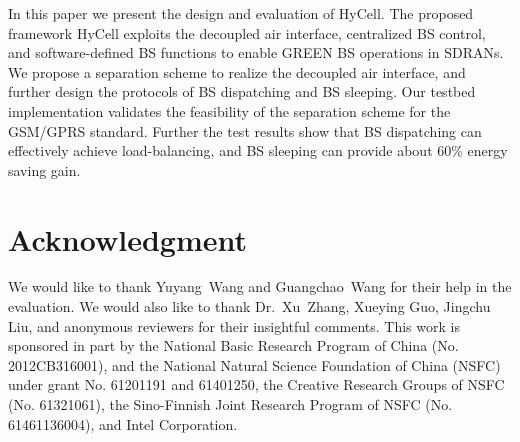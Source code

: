 \documentclass[conference]{IEEEtran}
\begin{document}
In this paper we present the design and evaluation of HyCell. The proposed
framework HyCell
exploits the decoupled air interface, centralized BS control, and software-defined BS
functions to enable GREEN BS operations in SDRANs. We propose
a separation scheme to realize the decoupled air interface, and
further design the protocols of BS dispatching and BS sleeping.
Our testbed implementation validates the feasibility of the separation scheme
for the GSM/GPRS standard.
Further the test results show that BS dispatching can effectively achieve load-balancing, and
BS sleeping can provide about 60\% energy saving gain.

\section*{Acknowledgment}

We would like to thank Yuyang~Wang and Guangchao~Wang for their help in
the evaluation. We would also like to thank Dr.~Xu~Zhang, Xueying Guo, Jingchu Liu,
and anonymous reviewers for their insightful comments.
This work is sponsored in part by the National Basic Research Program
of China (No. 2012CB316001), and the National Natural Science Foundation of
China (NSFC) under grant No. 61201191 and 61401250, the Creative Research Groups of
NSFC (No. 61321061), the Sino-Finnish Joint Research Program of NSFC
(No. 61461136004), and Intel Corporation.
\end{document}
